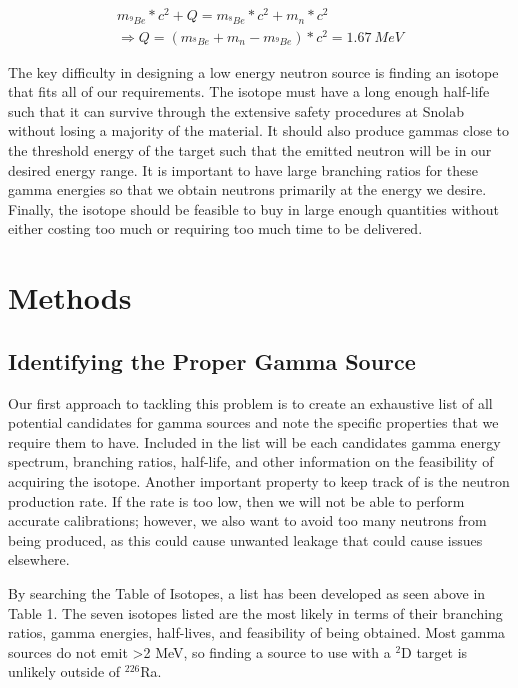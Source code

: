 \documentclass[%
12pt,
twoside,
reprint,
amsmath,amssymb,
aps,
]{article}
\begin{document}
	\begin{equation}
	\begin{aligned}	
	m_{^{9}Be} * c^{2} + Q = m_{^{8}Be} * c^{2} + m_{n} * c^{2} \\
	\Rightarrow Q = (m_{^{8}Be} + m_{n} - m_{^{9}Be}) * c^{2} = 1.67\ MeV
	\end{aligned}
	\end{equation}
	
	\par The key difficulty in designing a low energy neutron source is finding an isotope that fits all of our requirements. The isotope must have a long enough half-life such that it can survive through the extensive safety procedures at Snolab without losing a majority of the material. It should also produce gammas close to the threshold energy of the target such that the emitted neutron will be in our desired energy range. It is important to have large branching ratios for these gamma energies so that we obtain neutrons primarily at the energy we desire. Finally, the isotope should be feasible to buy in large enough quantities without either costing too much or requiring too much time to be delivered.
	
	\section{Methods}
	\subsection{Identifying the Proper Gamma Source}
	\par Our first approach to tackling this problem is to create an exhaustive list of all potential candidates for gamma sources and note the specific properties that we require them to have. Included in the list will be each candidates gamma energy spectrum, branching ratios, half-life, and other information on the feasibility of acquiring the isotope. Another important property to keep track of is the neutron production rate. If the rate is too low, then we will not be able to perform accurate calibrations; however, we also want to avoid too many neutrons from being produced, as this could cause unwanted leakage that could cause issues elsewhere.
	\par By searching the Table of Isotopes, a list has been developed as seen above in Table 1. The seven isotopes listed are the most likely in terms of their branching ratios, gamma energies, half-lives, and feasibility of being obtained. Most gamma sources do not emit >2 MeV, so finding a source to use with a $^{2}$D target is unlikely outside of $^{226}$Ra. 	
		
\end{document}
